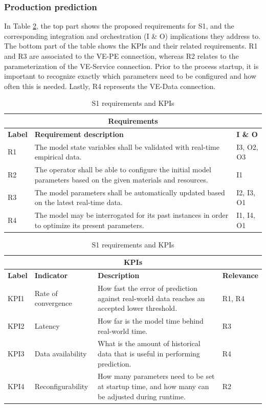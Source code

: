 \documentclass[journal,onecolumn]{IEEEtran} %
\begin{document}
\subsubsection{Production prediction}
In Table \ref{tab:s1rqkpi}, the top part shows the proposed requirements for S1, and the corresponding integration and orchestration (I \& O) implications they address to. The bottom part of the table shows the KPIs and their related requirements. R1 and R3 are associated to the VE-PE connection, whereas R2 relates to the parameterization of the VE-Service connection. Prior to the process startup, it is important to recognize exactly which parameters need to be configured and how often this is needed. Lastly, R4 represents the VE-Data connection.

\begin{table}[hbt!]
\centering
\begin{tabularx}{0.8\textwidth}{|p{1cm}|X|p{1.5cm}|}
\hline
\multicolumn{3}{|c|}{\textbf{Requirements}} \\
\hline
\textbf{Label} & \textbf{Requirement description} & \textbf{I \& O} \\ 
\hline            
R1 & The model state variables shall be validated with real-time empirical data. & I3, O2, O3 \\ 
\hline
R2 & The operator shall be able to configure the initial model parameters based on the given materials and resources. & I1 \\ 
\hline
R3 & The model parameters shall be automatically updated based on the latest real-time data. & I2, I3, O1 \\ 
\hline
R4 & The model may be interrogated for its past instances in order to optimize its present parameters. & I1, I4, O1 \\ 
\hline \hline
\end{tabularx}
\begin{tabularx}{0.8\textwidth}{|p{1cm}|p{2cm}|X|p{1.5cm}|}
\multicolumn{4}{|c|}{\textbf{KPIs}} \\ 
\hline
\textbf{Label} & \textbf{Indicator} & \textbf{Description} & \textbf{Relevance} \\ 
\hline
KPI1 & Rate of convergence & How fast the error of prediction against real-world data reaches an accepted lower threshold. & R1, R4 \\ 
\hline
KPI2 & Latency & How far is the model time behind real-world time. & R3 \\ 
\hline
KPI3 & Data availability & What is the amount of historical data that is useful in performing prediction. & R4 \\ 
\hline
KPI4 & Reconfigurability & How many parameters need to be set at startup time, and how many can be adjusted during runtime. & R2 \\ 
\hline
\end{tabularx}
\caption{S1 requirements and KPIs}
\label{tab:s1rqkpi}
\end{table}
\end{document}
